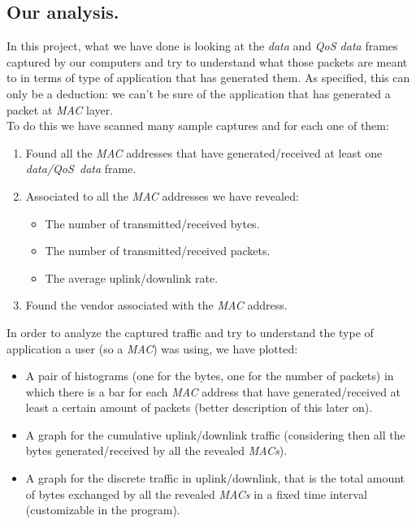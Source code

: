 \subsection{{Our analysis.}}
    In this project, what we have done is looking at the \textit{data} and \textit{QoS data} frames captured by our computers and
    try to understand what those packets are meant to in terms of type of application that has generated them. As specified, this 
    can only be a deduction: we can't be sure of the application that has generated a packet at \textit{MAC} layer.\\ 
    To do this we have scanned many sample captures and for each one of them:
    \begin{enumerate}
        \item Found all the \textit{MAC} addresses that have generated/received at least one \textit{data/QoS\ data} frame.
        \item Associated to all the \textit{MAC} addresses we have revealed:
        \begin{itemize}
            \item The number of transmitted/received bytes.
            \item The number of transmitted/received packets.
            \item The average uplink/downlink rate.
        \end{itemize}
        \item Found the vendor associated with the \textit{MAC} address.
    \end{enumerate}
    In order to analyze the captured traffic and try to understand the type of application a user (so a \textit{MAC}) was using,
    we have plotted: 
    \begin{itemize}
        \item A pair of histograms (one for the bytes, one for the number of packets) in which there is a bar for each
                \textit{MAC} address that have generated/received at least a certain amount of packets (better description of
                this later on).
        \item A graph for the cumulative uplink/downlink traffic (considering then all the bytes generated/received by all the 
                revealed \textit{MACs}).
        \item A graph for the discrete traffic in uplink/downlink, that is the total amount of bytes exchanged by all the revealed
                \textit{MACs} in a fixed time interval (customizable in the program).
    \end{itemize}